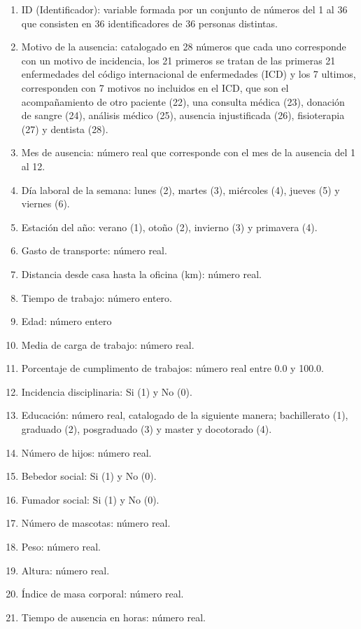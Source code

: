 \documentclass[a4paper, 11pt, twoside, openany, onecolumn, final]{memoir}
\begin{document}
	\begin{enumerate}
\item  ID (Identificador): variable formada por un conjunto de números del 1 al 36 que consisten en 36 identificadores de 36 personas distintas.
\item Motivo de la ausencia: catalogado en 28 números que cada uno corresponde con un motivo de incidencia, los 21 primeros se tratan de las primeras 21 enfermedades del código internacional de enfermedades (ICD) y los 7 ultimos, corresponden con 7 motivos no incluidos en el ICD, que son el acompañamiento de otro paciente (22), una consulta médica (23), donación de sangre (24), análisis médico (25), ausencia injustificada (26), fisioterapia (27) y dentista (28).
\item Mes de ausencia: número real que corresponde con el mes de la ausencia del 1 al 12.
\item Día laboral de la semana: lunes (2), martes (3), miércoles (4), jueves (5) y viernes (6). 
\item Estación del año: verano (1), otoño (2), invierno (3) y primavera (4).
\item Gasto de transporte: número real.
\item Distancia desde casa hasta la oficina (km): número real.
\item Tiempo de trabajo: número entero.
\item Edad: número entero
\item Media de carga de trabajo: número real.
\item Porcentaje de cumplimento de trabajos: número real entre 0.0 y 100.0.
\item Incidencia disciplinaria: Si (1) y No (0).
\item Educación: número real, catalogado de la siguiente manera; bachillerato (1), graduado (2), posgraduado (3) y master y docotorado (4).
\item Número de hijos: número real.
\item Bebedor social: Si (1) y No (0).
\item Fumador social: Si (1) y No (0).
\item Número de mascotas: número real.
\item Peso: número real.
\item Altura: número real.
\item Índice de masa corporal: número real.
\item Tiempo de ausencia en horas: número real.
\end{enumerate}
\end{document}

